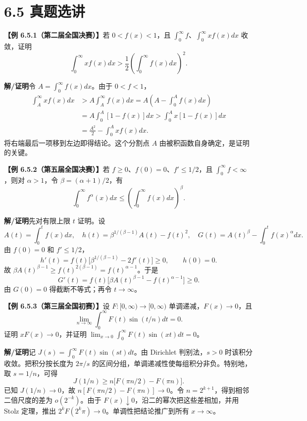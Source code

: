 \documentclass[UTF8,a4paper,11pt]{ctexart}
\newcommand{\ex}[1]{\par\noindent\textbf{【例 #1】}\;}
\newcommand{\sol}{\par\noindent\textbf{解/证明}\;}
\begin{document}
\section*{6.5 真题选讲}
\ex{6.5.1（第二届全国决赛）}若 $0<f(x)<1$，且 $\int_0^\infty f$、$\int_0^\infty xf(x)dx$ 收敛，证明
\[\int_0^\infty xf(x)dx>\frac12\left(\int_0^\infty f(x)dx\right)^2.\]
\sol 令 $A=\int_0^\infty f(x)dx$。由于 $0<f<1$，
\begin{align*}
\int_A^\infty xf(x)dx
&>A\int_A^\infty f(x)dx
=A\left(A-\int_0^Af(x)dx\right)\\
&=A\int_0^A[1-f(x)]dx
>\int_0^Ax[1-f(x)]dx\\
&=\frac{A^2}{2}-\int_0^Axf(x)dx.
\end{align*}
将右端最后一项移到左边即得结论。这个分割点 $A$ 由被积函数自身确定，是证明的关键。
\ex{6.5.2（第五届全国决赛）}若 $f\ge0$、$f(0)=0$、$f'\le1/2$，且 $\int_0^\infty f<\infty$，则对 $\alpha>1$，令 $\beta=(\alpha+1)/2$，有
\[\int_0^\infty f^\alpha(x)dx\le\left(\int_0^\infty f(x)dx\right)^\beta.\]
\sol 先对有限上限 $t$ 证明。设
\[A(t)=\int_0^tf(x)dx,\quad
h(t)=\beta^{1/(\beta-1)}A(t)-f(t)^2,\quad
G(t)=A(t)^\beta-\int_0^tf(x)^\alpha dx.\]
由 $f(0)=0$ 和 $f'\le1/2$，
\[h'(t)=f(t)\bigl[\beta^{1/(\beta-1)}-2f'(t)\bigr]\ge0,
\qquad h(0)=0.\]
故 $\beta A(t)^{\beta-1}\ge f(t)^{2(\beta-1)}=f(t)^{\alpha-1}$。于是
\[G'(t)=f(t)\bigl[\beta A(t)^{\beta-1}-f(t)^{\alpha-1}\bigr]\ge0.\]
由 $G(0)=0$ 得截断不等式；再令 $t\to\infty$。
\ex{6.5.3（第三届全国初赛）}设 $F:[0,\infty)\to[0,\infty)$ 单调递减，$F(x)\to0$，且
\[\lim_{n\to\infty}\int_0^\infty F(t)\sin(t/n)dt=0.\]
证明 $xF(x)\to0$，并证明 $\lim_{x\to0}\int_0^\infty F(t)\sin(xt)dt=0$。
\sol 记 $J(s)=\int_0^\infty F(t)\sin(st)dt$。由 Dirichlet 判别法，$s>0$ 时该积分收敛。把积分按长度为 $2\pi/s$ 的区间分组，单调递减性使每组积分非负。特别地，取 $s=1/n$，可得
\[J(1/n)\ge n\bigl[F(\pi n/2)-F(\pi n)\bigr].\]
已知 $J(1/n)\to0$，故 $n[F(\pi n/2)-F(\pi n)]\to0$。令 $n=2^{k+1}$，得到相邻二倍尺度的差为 $o(2^{-k})$。由于 $F(x)\downarrow0$，沿二的幂次把这些差相加，并用 Stolz 定理，推出 $2^kF(2^k\pi)\to0$。单调性把结论推广到所有 $x\to\infty$。
\end{document}
